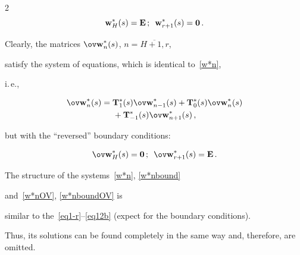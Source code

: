 \begin{multicols}{2}
\begin{equation}
\bmx{w}^*_H(s)


=


\bmx{E}\,;


\enskip  


\bmx{w}^*_{r+1}(s)


= 


\bmx{0}\,.


\end{equation}








\noindent Clearly, the matrices $\bmx{\ov w}^*_n(s)$, $n=\overline{H+1,r}$,


satisfy the system of equations, which is identical to~\eqref{w*n},


i.\,e.,


\begin{multline}


\label{w*nOV} \bmx{\ov w}^*_n(s)


= \bmx{T}^*_1(s)  \bmx{\ov w}^*_{n-1}(s)


+  \bmx{T}^*_0(s) \bmx{\ov w}^*_n(s)\\


{}+  \bmx{T}^*_{-1}(s) 


\bmx{\ov w}^*_{n+1}(s)\,,


\end{multline}





\noindent but with the ``reversed'' boundary conditions:


\begin{equation}


\label{w*nboundOV}


\bmx{\ov w}^*_H(s)


= \bmx{0}\,; \enskip  


\bmx{\ov w}^*_{r+1}(s) =  \bmx{E}\,.


\end{equation}





The structure of the systems~\eqref{w*n}, \eqref{w*nbound} 


and~\eqref{w*nOV}, \eqref{w*nboundOV} is


similar to the~\eqref{eq1-r}--\eqref{eq12b} (expect for the boundary conditions).


Thus, its solutions can be found completely in the same way and, therefore, are omitted.



\end{multicols}
